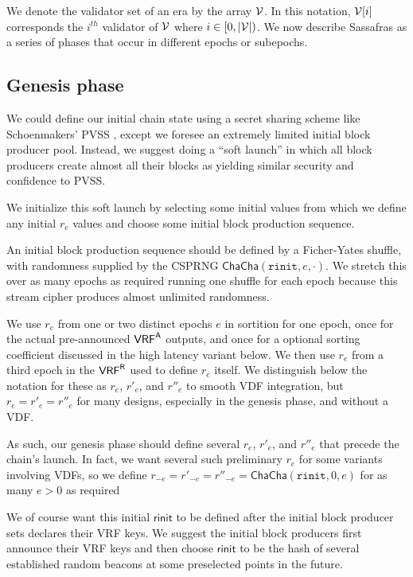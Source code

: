 We denote the validator set of an era by the array $ \mathcal{V} $.  In this notation, $ \mathcal{V}[i] $ corresponds the $ i^{th} $ validator of  $ \mathcal{V} $ where $ i \in [0, |\mathcal{V}|) $.   We now describe Sassafras as a series of phases that occur in different epochs or subepochs.

\subsection{Genesis phase}
\label{subsec:genesis_phase}
\newcommand{\rinit}{\mathtt{rinit}} %

We could define our initial chain state using a secret sharing scheme like Schoenmakers' PVSS \cite{Schoenmakers_PVSS}, except we foresee an extremely limited initial block producer pool.  
Instead, we suggest doing a ``soft launch'' in which all block producers create almost all their blocks as yielding similar security and confidence to PVSS. 

We initialize this soft launch by selecting some initial \rinit values from which we define any initial $r_e$ values and choose some initial block production sequence. 

An initial block production sequence should be defined by a Ficher-Yates shuffle, with randomness supplied by the CSPRNG $\mathsf{ChaCha}(\rinit,e,\cdot)$.  We stretch this over as many epochs as required running one shuffle for each epoch because this stream cipher produces almost unlimited randomness.

We use $r_e$ from one or two distinct epochs $e$ in sortition for one epoch, once for the actual pre-announced $\mathsf{VRF}^{\mathsf{A}}$ outputs, and once for a optional sorting coefficient discussed in the high latency variant below.  We then use $r_e$ from a third epoch in the $\mathsf{VRF}^{\mathsf{R}}$ used to define $r_e$ itself.  We distinguish below the notation for these as $r_e$, $r'_e$, and $r''_e$ to smooth VDF integration, but $r_e = r'_e = r''_e$ for many designs, especially in the genesis phase, and without a VDF.

As such, our genesis phase should define several $r_e$, $r'_e$, and $r''_e$ that precede the chain's launch.  In fact, we want several such preliminary $r_e$ for some variants involving VDFs, so we define $r_{-e} = r'_{-e} = r''_{-e} = \mathsf{ChaCha}(\rinit,0,e)$ for as many $e > 0$ as required

We of course want this initial $\mathsf{rinit}$ to be defined after the initial block producer sets declares their VRF keys.  We suggest the initial block producers first announce their VRF keys and then choose $\mathsf{rinit}$ to be the hash of several established random beacons at some preselected points in the future.


